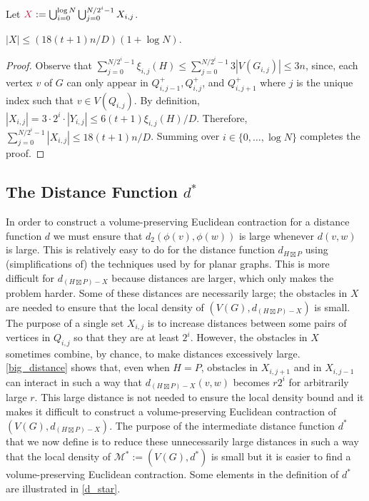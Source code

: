 \documentclass{patmorin}
\makeatletter
\renewcommand{\le}{\leqslant}
\def\mathcolor#1#{\@mathcolor{#1}}
\def\@mathcolor#1#2#3{%
  \protect\leavevmode
  \begingroup
    \color#1{#2}#3%
  \endgroup
}
\newcommand{\mathdefin}[1]{\mathcolor{brightmaroon}{#1}}
\makeatother
\begin{document}
Let $\mathdefin{X}:=\bigcup_{i=0}^{\log N}\bigcup_{j=0}^{N/2^i-1} X_{i,j}$.

\begin{lem}
  $|X|\le (18(t+1)n/D)(1+\log N)$.
\end{lem}

\begin{proof}
  Observe that $\sum_{j=0}^{N/2^i-1} \xi_{i,j}(H)\le\sum_{j=0}^{N/2^i-1} 3|V(G_{i,j})| \le 3n$, since, each vertex $v$ of $G$ can only appear in $Q^+_{i,j-1}, Q^+_{i,j}$, and $Q^+_{i,j+1}$ where $j$ is the unique index such that $v\in V(Q_{i,j})$.    By definition, $|X_{i,j}|=3\cdot 2^i \cdot |Y_{i,j}| \le 6(t+1)\xi_{i,j}(H)/D$.  Therefore, $\sum_{j=0}^{N/2^i-1} |X_{i,j}|\le 18(t+1)n/D$. Summing over $i\in\{0,\ldots,\log N\}$ completes the proof.
\end{proof}

\subsection{\boldmath The Distance Function $d^*$}
\label{d_star_definition}

In order to construct a volume-preserving Euclidean contraction for a distance function $d$ we must ensure that $d_2(\phi(v),\phi(w))$ is large whenever $d(v,w)$ is large.  This is relatively easy to do for the distance function $d_{H\boxtimes P}$ using (simplifications of) the techniques used by \citet{rao:small} for planar graphs. This is more difficult for $d_{(H\boxtimes P)-X}$ because distances are larger, which only makes the problem harder.  Some of these distances are necessarily large; the obstacles in $X$ are needed to ensure that the local density of $(V(G),d_{(H\boxtimes P)-X})$ is small.  The purpose of a single set $X_{i,j}$ is to increase distances between some pairs of vertices in $Q_{i,j}$ so that they are at least $2^i$.  However, the obstacles in $X$ sometimes combine, by chance, to make distances excessively large. \cref{big_distance} shows that, even when $H=P$, obstacles in $X_{i,j+1}$ and in $X_{i,j-1}$ can interact in such a way that $d_{(H\boxtimes P)-X}(v,w)$ becomes $r2^i$ for arbitrarily large $r$.  This large distance is not needed to ensure the local density bound and it makes it difficult to construct a volume-preserving Euclidean contraction of $(V(G),d_{(H\boxtimes P)-X})$.  The purpose of the intermediate distance function $d^*$ that we now define is to reduce these unnecessarily large distances in such a way that the local density of $\mathcal{M}^*:=(V(G),d^*)$ is small but it is easier to find a volume-preserving Euclidean contraction. Some elements in the definition of $d^*$ are illustrated in \cref{d_star}.
\end{document}
